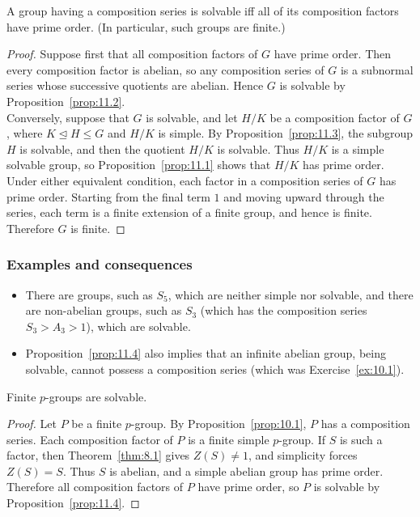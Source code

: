 \documentclass[../Odyssey_Project.tex]{subfiles}
\begin{document}
\begin{proposition}
\label{prop:11.4}
A group having a composition series is solvable iff all of its composition factors have prime order. (In particular, such groups are finite.)
\end{proposition}
\begin{proof}
    Suppose first that all composition factors of $G$ have prime order. Then every composition factor is abelian, so any composition series of $G$ is a subnormal series whose successive quotients are abelian. Hence $G$ is solvable by Proposition~\ref{prop:11.2}. \\
    Conversely, suppose that $G$ is solvable, and let $H/K$ be a composition factor of $G$, where $K \trianglelefteq H \leq G$ and $H/K$ is simple. By Proposition~\ref{prop:11.3}, the subgroup $H$ is solvable, and then the quotient $H/K$ is solvable. Thus $H/K$ is a simple solvable group, so Proposition~\ref{prop:11.1} shows that $H/K$ has prime order. \\
    Under either equivalent condition, each factor in a composition series of $G$ has prime order. Starting from the final term $1$ and moving upward through the series, each term is a finite extension of a finite group, and hence is finite. Therefore $G$ is finite.
\end{proof}

\subsubsection*{Examples and consequences}
\begin{itemize}
    \item There are groups, such as $S_5$, which are neither simple nor solvable, and there are non-abelian groups, such as $S_3$ (which has the composition series $S_3 > A_3 > 1$), which are solvable.
    \item Proposition~\ref{prop:11.4} also implies that an infinite abelian group, being solvable, cannot possess a composition series (which was Exercise~\ref{ex:10.1}).
\end{itemize}

\begin{corollary}
\label{cor:11.5}
Finite $p$-groups are solvable.
\end{corollary}
\begin{proof}
    Let $P$ be a finite $p$-group. By Proposition~\ref{prop:10.1}, $P$ has a composition series. Each composition factor of $P$ is a finite simple $p$-group. If $S$ is such a factor, then Theorem~\ref{thm:8.1} gives $Z(S)\neq 1$, and simplicity forces $Z(S)=S$. Thus $S$ is abelian, and a simple abelian group has prime order. Therefore all composition factors of $P$ have prime order, so $P$ is solvable by Proposition~\ref{prop:11.4}.
\end{proof}
\end{document}
